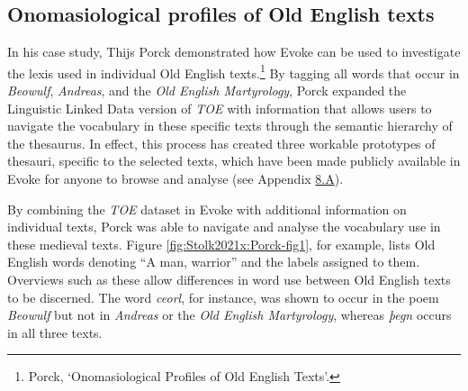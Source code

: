 
\subsection{Onomasiological profiles of Old English texts}

In his case study, Thijs Porck demonstrated how Evoke can be used to investigate the lexis used in individual Old English texts.\footnote{Porck, `Onomasiological Profiles of Old English Texts'.} %
By tagging all words that occur in \textit{Beowulf}, \textit{Andreas}, and the \textit{Old English Martyrology}, Porck expanded the Linguistic Linked Data version of \textit{TOE} with information that allows users to navigate the vocabulary in these specific texts through the semantic hierarchy of the thesaurus. In effect, this process has created three workable prototypes of thesauri, specific to the selected texts, which have been made publicly available in Evoke for anyone to browse and analyse (see Appendix \hyperref[Appendix8.A]{8.A}).

By combining the \textit{TOE} dataset in Evoke with additional information on individual texts, Porck was able to navigate and analyse the vocabulary use in these medieval texts. Figure \ref{fig:Stolk2021x:Porck-fig1}, for example, lists Old English words denoting ``A man, warrior'' and the labels assigned to them. Overviews such as these allow differences in word use between Old English texts to be discerned. The word \textit{ceorl}, for instance, was shown to occur in the poem \textit{Beowulf} but not in \textit{Andreas} or the \textit{Old English Martyrology}, whereas \textit{þegn} occurs in all three texts. 

